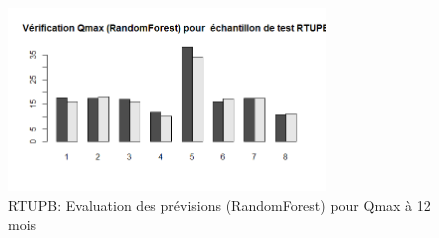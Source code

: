 \begin{figure}[H]
\centering
\includegraphics[width=0.75\textwidth]{../Fig/RTUPB/rtupb-forest-test-qmax12.png}
\caption{RTUPB: Evaluation des prévisions (RandomForest) pour Qmax à 12 mois}
\label{fig-rtupb-forest-test-qmax12}
\end{figure}
